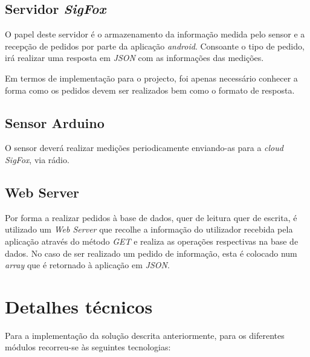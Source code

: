 \documentclass[a4paper]{article}
\begin{document}
\subsection{Servidor \textit{SigFox}}

O papel deste servidor é o armazenamento da informação medida pelo sensor e a recepção de pedidos por parte da aplicação \textit{android}. Consoante o tipo de pedido, irá realizar uma resposta em \textit{JSON} com as informações das medições.

Em termos de implementação para o projecto, foi apenas necessário conhecer a forma como os pedidos devem ser realizados bem como o formato de resposta.

\subsection{Sensor Arduino}

O sensor deverá realizar medições periodicamente enviando-as para a \textit{cloud SigFox}, via rádio.

\subsection{Web Server}

Por forma a realizar pedidos à base de dados, quer de leitura quer de escrita, é utilizado um \textit{Web Server} que recolhe a informação do utilizador recebida pela aplicação através do método \textit{GET} e realiza as operações respectivas na base de dados. No caso de ser realizado um pedido de informação, esta é colocado num \textit{array} que é retornado à aplicação em \textit{JSON}.

\section{Detalhes técnicos}

Para a implementação da solução descrita anteriormente, para os diferentes módulos recorreu-se às seguintes tecnologias:
\end{document}
